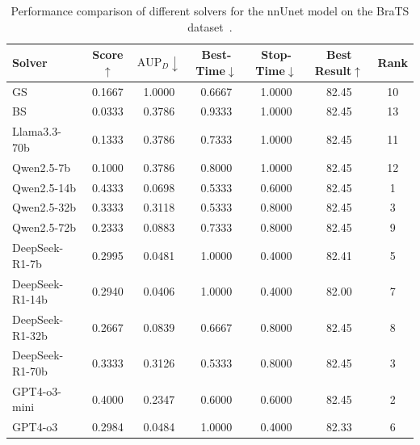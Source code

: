 \begin{table}[h]
    \centering
    \setlength{\tabcolsep}{3pt}
    \renewcommand\arraystretch{1.5}
    \caption{Performance comparison of different solvers for the nnUnet model on the BraTS dataset~\cite{brats}.}
    \begin{tabular}{l|cccccc}
    \toprule
    Solver           & Score$\uparrow$ & $\text{AUP}_D\downarrow$ & Best-Time$\downarrow$ & Stop-Time$\downarrow$ & Best Result$\uparrow$ & Rank \\
    \midrule
    GS & 0.1667 & 1.0000 & 0.6667 & 1.0000 & 82.45 & 10 \\
    BS & 0.0333 & 0.3786 & 0.9333 & 1.0000 & 82.45 & 13 \\
    Llama3.3-70b & 0.1333 & 0.3786 & 0.7333 & 1.0000 & 82.45 & 11 \\
    Qwen2.5-7b & 0.1000 & 0.3786 & 0.8000 & 1.0000 & 82.45 & 12 \\
    Qwen2.5-14b & 0.4333 & 0.0698 & 0.5333 & 0.6000 & 82.45 & 1 \\
    Qwen2.5-32b & 0.3333 & 0.3118 & 0.5333 & 0.8000 & 82.45 & 3 \\
    Qwen2.5-72b & 0.2333 & 0.0883 & 0.7333 & 0.8000 & 82.45 & 9 \\
    DeepSeek-R1-7b & 0.2995 & 0.0481 & 1.0000 & 0.4000 & 82.41 & 5 \\
    DeepSeek-R1-14b & 0.2940 & 0.0406 & 1.0000 & 0.4000 & 82.00 & 7 \\
    DeepSeek-R1-32b & 0.2667 & 0.0839 & 0.6667 & 0.8000 & 82.45 & 8 \\
    DeepSeek-R1-70b & 0.3333 & 0.3126 & 0.5333 & 0.8000 & 82.45 & 3 \\
    GPT4-o3-mini & 0.4000 & 0.2347 & 0.6000 & 0.6000 & 82.45 & 2 \\
    GPT4-o3 & 0.2984 & 0.0484 & 1.0000 & 0.4000 & 82.33 & 6 \\
    \bottomrule
    \end{tabular}
    \label{tab:nnUnet}
\end{table}



